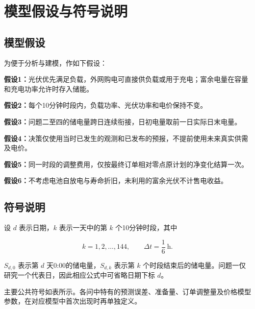\section{模型假设与符号说明}

\subsection{模型假设}

为便于分析与建模，作如下假设：

\noindent\textbf{假设1：}光伏优先满足负载，外网购电可直接供负载或用于充电；富余电量在容量和充电功率允许时存入储能。

\noindent\textbf{假设2：}每个10分钟时段内，负载功率、光伏功率和电价保持不变。

\noindent\textbf{假设3：}问题二至四的储电量跨日连续衔接，日初电量取前一日实际日末电量。

\noindent\textbf{假设4：}决策仅使用当时已发生的观测和已发布的预报，不提前使用未来真实供需及电价。

\noindent\textbf{假设5：}同一时段的调整费用，仅按最终订单相对零点原计划的净变化结算一次。

\noindent\textbf{假设6：}不考虑电池自放电与寿命折旧，未利用的富余光伏不计售电收益。

\newpage
\subsection{符号说明}

设 $d$ 表示日期，$k$ 表示一天中的第 $k$ 个10分钟时段，其中

\begin{equation}
k=1,2,\ldots,144,
\qquad
\Delta t=\frac{1}{6}\ \mathrm{h}.
\end{equation}

$S_{d,0}$ 表示第 $d$ 天0:00的储电量，$S_{d,k}$ 表示第 $k$ 个时段结束后的储电量。问题一仅研究一个代表日，因此相应公式中可省略日期下标 $d$。

主要公共符号如表所示。各问中特有的预测误差、准备量、订单调整量及价格模型参数，在对应模型中首次出现时再单独定义。

